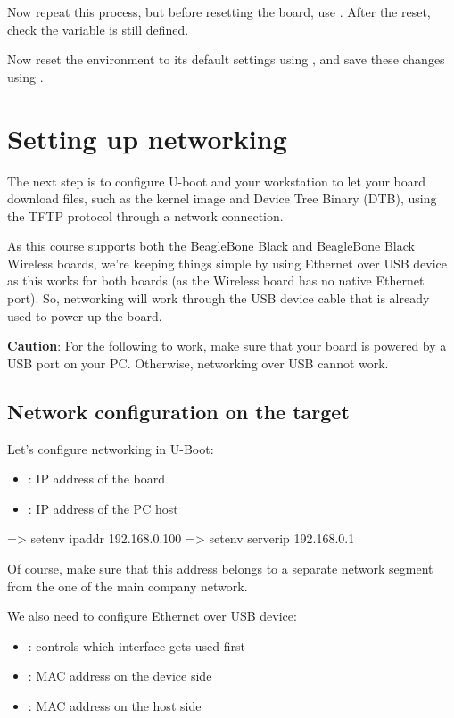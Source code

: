 Now repeat this process, but before resetting the board, use
. After the reset, check the  variable is
still defined.

Now reset the environment to its default settings using , and save these changes using .

\section{Setting up networking}

The next step is to configure U-boot and your workstation to let your
board download files, such as the kernel image and Device Tree Binary
(DTB), using the TFTP protocol through a network connection.

As this course supports both the BeagleBone Black and BeagleBone Black
Wireless boards, we're keeping things simple by using Ethernet over USB
device as this works for both boards (as the Wireless board has no
native Ethernet port). So, networking will work through the USB device
cable that is already used to power up the board.

{\bf Caution}: For the following to work, make sure that your board
is powered by a USB port on your PC. Otherwise, networking over USB
cannot work.

\subsection{Network configuration on the target}

Let's configure networking in U-Boot:

\begin{itemize}
  \item {}: IP address of the board
  \item {}: IP address of the PC host
\end{itemize}

\begin{ubootinput}
=> setenv ipaddr 192.168.0.100
=> setenv serverip 192.168.0.1
\end{ubootinput}

Of course, make sure that this address belongs to a separate network
segment from the one of the main company network.

We also need to configure Ethernet over USB device:
\begin{itemize}
  \item {}: controls which interface gets used first
  \item {}: MAC address on the device side
  \item {}: MAC address on the host side
\end{itemize}

